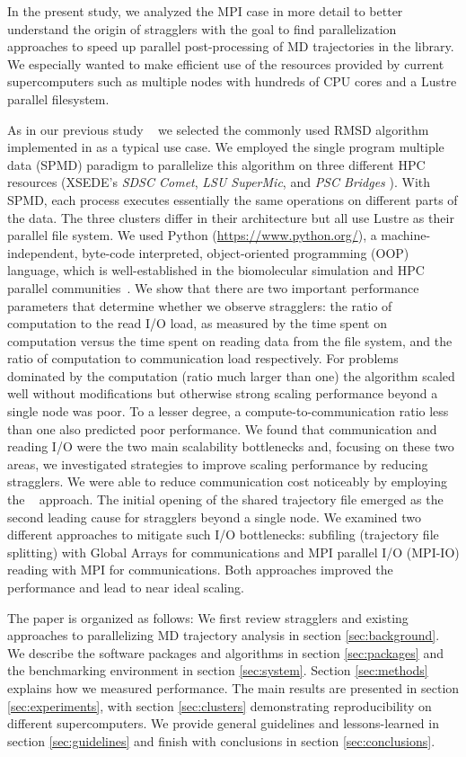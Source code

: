 In the present study, we analyzed the MPI case in more detail to better understand the origin of stragglers with the goal to find  parallelization approaches to speed up parallel post-processing of MD trajectories in the  library.
We especially wanted to make efficient use of the resources provided by current supercomputers such as multiple nodes with hundreds of CPU cores and a Lustre parallel filesystem.

As in our previous study ~\cite{Khoshlessan:2017ab} we selected the commonly used RMSD algorithm implemented in  as a typical use case.
We employed the single program multiple data (SPMD) paradigm to parallelize this algorithm on three different HPC resources (XSEDE's \emph{SDSC Comet}, \emph{LSU SuperMic}, and \emph{PSC Bridges} \cite{xsede}).
With SPMD, each process executes essentially the same operations on different parts of the data.
The three clusters differ in their architecture but all use Lustre as their parallel file system.
We used Python (\url{https://www.python.org/}), a machine-independent, byte-code interpreted, object-oriented programming (OOP) language, which is well-established in the biomolecular simulation and HPC parallel communities~\cite{Dalcin:2011aa, GAiN}. 
We show that there are two important performance parameters that determine whether we observe stragglers: the ratio of computation to the read I/O load, as measured by the time spent on computation versus the time spent on reading data from the file system, and the ratio of computation to communication load respectively.
For problems dominated by the computation (ratio much larger than one) the algorithm scaled well without modifications but otherwise strong scaling performance beyond a single node was poor.
To a lesser degree, a compute-to-communication ratio less than one also predicted poor performance.
We found that communication and reading I/O were the two main scalability bottlenecks and, focusing on these two areas, we investigated strategies to improve scaling performance by reducing stragglers. 
We were able to reduce communication cost noticeably by employing the ~\cite{GA, GAiN} approach.
The initial opening of the shared trajectory file emerged as the second leading cause for stragglers beyond a single node.
We examined two different approaches to mitigate such I/O bottlenecks: subfiling (trajectory file splitting) with Global Arrays for communications and MPI parallel I/O (MPI-IO) reading with MPI for communications.
Both approaches improved the performance and lead to near ideal scaling.

The paper is organized as follows:
We first review stragglers and existing approaches to parallelizing MD trajectory analysis in section \ref{sec:background}.
We describe the software packages and algorithms in section \ref{sec:packages} and the benchmarking environment in section \ref{sec:system}.
Section \ref{sec:methods} explains how we measured performance.
The main results are presented in section \ref{sec:experiments}, with section \ref{sec:clusters} demonstrating reproducibility on different supercomputers.
We provide general guidelines and lessons-learned in section \ref{sec:guidelines} and finish with conclusions in section \ref{sec:conclusions}.
